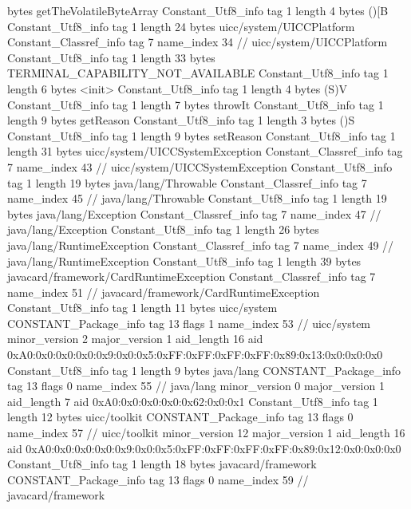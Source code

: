 {{{			bytes	getTheVolatileByteArray
		}
		Constant_Utf8_info {
			tag	1
			length	4
			bytes	()[B
		}
		Constant_Utf8_info {
			tag	1
			length	24
			bytes	uicc/system/UICCPlatform
		}
		Constant_Classref_info {
			tag	7
			name_index	34		// uicc/system/UICCPlatform
		}
		Constant_Utf8_info {
			tag	1
			length	33
			bytes	TERMINAL_CAPABILITY_NOT_AVAILABLE
		}
		Constant_Utf8_info {
			tag	1
			length	6
			bytes	<init>
		}
		Constant_Utf8_info {
			tag	1
			length	4
			bytes	(S)V
		}
		Constant_Utf8_info {
			tag	1
			length	7
			bytes	throwIt
		}
		Constant_Utf8_info {
			tag	1
			length	9
			bytes	getReason
		}
		Constant_Utf8_info {
			tag	1
			length	3
			bytes	()S
		}
		Constant_Utf8_info {
			tag	1
			length	9
			bytes	setReason
		}
		Constant_Utf8_info {
			tag	1
			length	31
			bytes	uicc/system/UICCSystemException
		}
		Constant_Classref_info {
			tag	7
			name_index	43		// uicc/system/UICCSystemException
		}
		Constant_Utf8_info {
			tag	1
			length	19
			bytes	java/lang/Throwable
		}
		Constant_Classref_info {
			tag	7
			name_index	45		// java/lang/Throwable
		}
		Constant_Utf8_info {
			tag	1
			length	19
			bytes	java/lang/Exception
		}
		Constant_Classref_info {
			tag	7
			name_index	47		// java/lang/Exception
		}
		Constant_Utf8_info {
			tag	1
			length	26
			bytes	java/lang/RuntimeException
		}
		Constant_Classref_info {
			tag	7
			name_index	49		// java/lang/RuntimeException
		}
		Constant_Utf8_info {
			tag	1
			length	39
			bytes	javacard/framework/CardRuntimeException
		}
		Constant_Classref_info {
			tag	7
			name_index	51		// javacard/framework/CardRuntimeException
		}
		Constant_Utf8_info {
			tag	1
			length	11
			bytes	uicc/system
		}
		CONSTANT_Package_info {
			tag	13
			flags	1
			name_index	53		// uicc/system
			minor_version	2
			major_version	1
			aid_length	16
			aid	0xA0:0x0:0x0:0x0:0x9:0x0:0x5:0xFF:0xFF:0xFF:0xFF:0x89:0x13:0x0:0x0:0x0
		}
		Constant_Utf8_info {
			tag	1
			length	9
			bytes	java/lang
		}
		CONSTANT_Package_info {
			tag	13
			flags	0
			name_index	55		// java/lang
			minor_version	0
			major_version	1
			aid_length	7
			aid	0xA0:0x0:0x0:0x0:0x62:0x0:0x1
		}
		Constant_Utf8_info {
			tag	1
			length	12
			bytes	uicc/toolkit
		}
		CONSTANT_Package_info {
			tag	13
			flags	0
			name_index	57		// uicc/toolkit
			minor_version	12
			major_version	1
			aid_length	16
			aid	0xA0:0x0:0x0:0x0:0x9:0x0:0x5:0xFF:0xFF:0xFF:0xFF:0x89:0x12:0x0:0x0:0x0
		}
		Constant_Utf8_info {
			tag	1
			length	18
			bytes	javacard/framework
		}
		CONSTANT_Package_info {
			tag	13
			flags	0
			name_index	59		// javacard/framework
}}}
